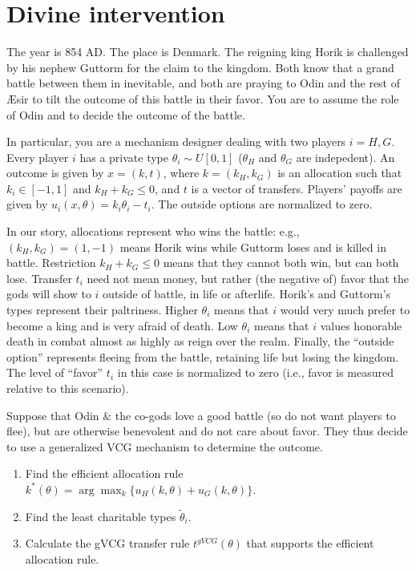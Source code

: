 \documentclass[a4paper]{article}
\begin{document}
\fi



\section{Divine intervention}

The year is 854 AD. The place is Denmark. The reigning king Horik is challenged by his nephew Guttorm for the claim to the kingdom. Both know that a grand battle between them in inevitable, and both are praying to Odin and the rest of {\AE}sir to tilt the outcome of this battle in their favor. You are to assume the role of Odin and to decide the outcome of the battle.

In particular, you are a mechanism designer dealing with two players $i=H,G$. Every player $i$ has a private type $\theta_i \sim U[0,1]$ ($\theta_H$ and $\theta_G$ are indepedent). An outcome is given by $x=(k,t)$, where $k=(k_H,k_G)$ is an allocation such that $k_i \in [-1,1]$ and $k_H + k_G \leq 0$, and $t$ is a vector of transfers. Players' payoffs are given by $u_i(x,\theta) = k_i \theta_i - t_i$. The outside options are normalized to zero.

In our story, allocations represent who wins the battle: e.g., $(k_H,k_G)=(1,-1)$ means Horik wins while Guttorm loses and is killed in battle. Restriction $k_H + k_G \leq 0$ means that they cannot both win, but can both lose. Transfer $t_i$ need not mean money, but rather (the negative of) favor that the gods will show to $i$ outside of battle, in life or afterlife.
Horik's and Guttorm's types represent their paltriness. Higher $\theta_i$ means that $i$ would very much prefer to become a king and is very afraid of death. Low $\theta_i$ means that $i$ values honorable death in combat almost as highly as reign over the realm. Finally, the ``outside option'' represents fleeing from the battle, retaining life but losing the kingdom. The level of ``favor'' $t_i$ in this case is normalized to zero (i.e., favor is measured relative to this scenario).

Suppose that Odin \& the co-gods love a good battle (so do not want players to flee), but are otherwise benevolent and do not care about favor. They thus decide to use a generalized VCG mechanism to determine the outcome.

\begin{enumerate}
	\item Find the efficient allocation rule $k^*(\theta) = \arg \max_k \{u_H(k,\theta) + u_G(k,\theta)\}$.
	\item Find the least charitable types $\tilde{\theta}_i$.
	\item Calculate the gVCG transfer rule $t^{gVCG}(\theta)$ that supports the efficient allocation rule.
\end{enumerate}
\end{document}
